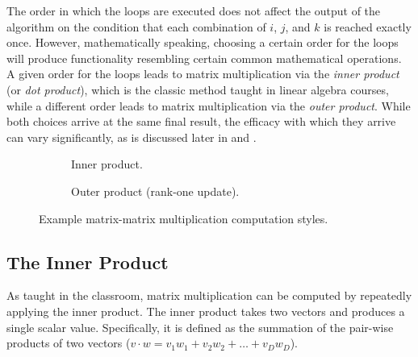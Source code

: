 \documentclass[\main/thesis.tex]{subfiles}
\begin{document}
The order in which the loops are executed does not affect the output of the algorithm on the condition that each combination of $i$, $j$, and $k$ is reached exactly once.
However, mathematically speaking, choosing a certain order for the loops will produce functionality resembling certain common mathematical operations.
A given order for the loops leads to matrix multiplication via the \emph{inner product} (or \emph{dot product}), which is the classic method taught in linear algebra courses, while a different order leads to matrix multiplication via the \emph{outer product}.
While both choices arrive at the same final result, the efficacy with which they arrive can vary significantly, as is discussed later in  and .

\begin{figure}[t]
 \hfill
  \begin{subfigure}{.45\linewidth}
    \centering
    \caption{Inner product.}
    \label{fig:innerProduct}
  \end{subfigure}
 \hfill
  \begin{subfigure}{.45\linewidth}
    \centering
  \caption{Outer product (rank-one update).}
    \label{fig:outerProduct}
  \end{subfigure}
  \hfill
  \caption[Matrix-Matrix Computation Styles]{Example matrix-matrix multiplication computation styles.}
  \label{fig:product}
  \vspace{-0.15cm}
\end{figure}

\subsection{The Inner Product}
As taught in the classroom, matrix multiplication can be computed by repeatedly applying the inner product.
The inner product takes two vectors and produces a single scalar value.
Specifically, it is defined as the summation of the pair-wise products of two vectors (\eg $v \cdot w=v_{1}w_{1} + v_{2}w_{2} + \ldots + v_{D}w_{D}$).
\end{document}
